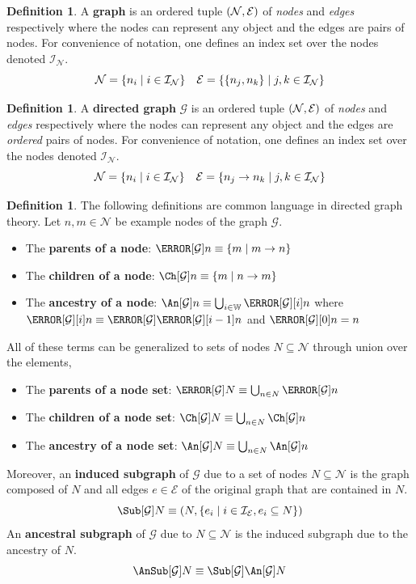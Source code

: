\documentclass[aps, 10pt, english, twoside, pra, nofootinbib, longbibliography]{revtex4-1}
\theoremstyle{plain}
\theoremstyle{definition}
\newtheorem{definition}[theorem]{Definition}
\theoremstyle{remark}
\newcommand{\graph}{\mathcal{G}}
\newcommand{\nodes}{\mathcal{N}}
\newcommand{\edges}{\mathcal{E}}
\newcommand{\ind}{\mathcal{I}}
\newcommand{\term}[1]{\textcolor{Mahogany}{\textbf{#1}}}
\begin{document}
    \begin{definition}
        \label{def:graph}
        A \term{graph} is an ordered tuple $\br{\nodes, \edges}$ of \textit{nodes} and \textit{edges} respectively where the nodes can represent any object and the edges are pairs of nodes. For convenience of notation, one defines an index set over the nodes denoted $\ind_\nodes$.
        \[ \nodes = \bc{n_i \mid i \in \ind_\nodes} \quad \edges = \bc{\bc{n_j, n_k} \mid j,k \in \ind_\nodes} \]
    \end{definition}

    \begin{definition}
        \label{def:directed_graph}
        A \term{directed graph} $\graph$ is an ordered tuple $\br{\nodes, \edges}$ of \textit{nodes} and \textit{edges} respectively where the nodes can represent any object and the edges are \textit{ordered} pairs of nodes. For convenience of notation, one defines an index set over the nodes denoted $\ind_\nodes$.
        \[ \nodes = \bc{n_i \mid i \in \ind_\nodes} \quad \edges = \bc{n_j \to n_k \mid j,k \in \ind_\nodes} \]
    \end{definition}

    \begin{definition}
        \label{def:graph_terms}
        The following definitions are common language in directed graph theory. Let $n, m \in \nodes$ be example nodes of the graph $\graph$.
        \begin{itemize}
            \item The \term{parents of a node}: $\Pa[\graph]{n} \defined \bc{m \mid m \to n}$
            \item The \term{children of a node}: $\Ch[\graph]{n} \defined \bc{m \mid n \to m}$
            \item The \term{ancestry of a node}: $\An[\graph]{n} \defined \bigcup_{i\in\mathbb{W}} \Pa[\graph][i]{n}$ where $\Pa[\graph][i]{n} \defined \Pa[\graph]{\Pa[\graph][i-1]{n}}$ and $\Pa[\graph][0]{n} = n$
        \end{itemize}
        All of these terms can be generalized to sets of nodes $N \subseteq \nodes$ through union over the elements,
        \begin{itemize}
            \item The \term{parents of a node set}: $\Pa[\graph]{N} \defined \bigcup_{n\in N}\Pa[\graph]{n}$
            \item The \term{children of a node set}: $\Ch[\graph]{N} \defined \bigcup_{n\in N}\Ch[\graph]{n}$
            \item The \term{ancestry of a node set}: $\An[\graph]{N} \defined \bigcup_{n\in N}\An[\graph]{n}$
        \end{itemize}
        Moreover, an \term{induced subgraph} of $\graph$ due to a set of nodes $N \subseteq \nodes$ is the graph composed of $N$ and all edges $e \in \edges$ of the original graph that are contained in $N$.
        \[ \Sub[\graph]{N} \defined \br{N, \bc{e_i \mid i \in \ind_\edges, e_i \subseteq N}}\]
        An \term{ancestral subgraph} of $\graph$ due to $N \subseteq \nodes$ is the induced subgraph due to the ancestry of $N$.
        \[ \AnSub[\graph]{N} \defined \Sub[\graph]{\An[\graph]{N}} \]
    \end{definition}
\end{document}
